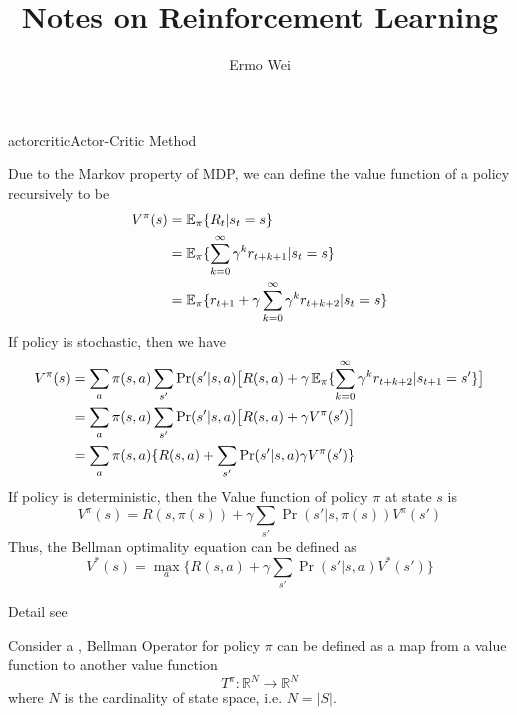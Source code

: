 \documentclass[9pt]{article}
\begin{document}
\title{Notes on Reinforcement Learning}
\author{Ermo Wei}
\date{}

\maketitle

\tableofcontents
\hypersetup{colorlinks=blue}

\clearpage 

\newcommand{\lackcite}

\ItemTitle{actorcritic}{Actor-Critic Method} \Working

 Due to the Markov property of MDP, we can define the value function of a policy recursively to be 
\begin{displaymath}
  \begin{split}
    V^{\pi}(s) & = \operatorname{\mathbb{E}}_{\pi}\{R_t|s_t=s\}\\
    & = \operatorname{\mathbb{E}}_{\pi}\{\sum_{k=0}^{\infty}{\gamma^{k}r_{t+k+1}}|s_t = s\}\\
    & = \operatorname{\mathbb{E}}_{\pi}\{r_{t+1}+\gamma \sum_{k=0}^{\infty}{\gamma^{k}r_{t+k+2}}|s_t = s\}\\
  \end{split}
\end{displaymath}
If policy is stochastic, then we have
\begin{displaymath}
  \begin{split}
    V^{\pi}(s) & = \sum_{a}\pi(s,a)\sum_{s'}\Pr(s'|s,a)\big[R(s,a)+\gamma \operatorname{\mathbb{E}}_{\pi}\{\sum_{k=0}^{\infty}\gamma^{k}r_{t+k+2}|s_{t+1}=s'\}\big]\\
    & = \sum_{a}\pi(s,a)\sum_{s'}\Pr(s'|s,a)\big[R(s,a)+\gamma V^{\pi}(s')\big]\\
    & = \sum_{a}\pi(s,a)\{R(s,a)+\sum_{s'}\Pr(s'|s,a)\gamma V^{\pi}(s')\}
  \end{split}
\end{displaymath}
If policy is deterministic, then the Value function of policy $\pi$ at state $s$ is
\begin{displaymath}
  V^{\pi}(s) = R(s,\pi(s))+\gamma \sum_{s'}\Pr(s'|s,\pi(s))V^{\pi}(s')
\end{displaymath}
Thus, the Bellman optimality equation can be defined as
\begin{displaymath}
  V^{*}(s) = \max_a \{R(s,a)+\gamma \sum_{s'}\Pr(s'|s,a)V^{*}(s')\}
\end{displaymath}

Detail see \citep{barto1998reinforcement}

 Consider a , Bellman Operator for policy $\pi$ can be defined as a map from a value function to another value function
\begin{displaymath}
  T^\pi:\mathbb{R}^N \rightarrow \mathbb{R}^N
\end{displaymath}
where $N$ is the cardinality of state space, i.e. $N = |S|$.
\end{document}
